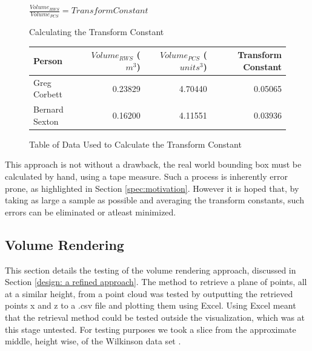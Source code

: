 \begin{figure}[h]
\begin{center}
$\frac{Volume_{RWS}}{Volume_{PCS}} = Transform Constant$
\end{center}
\caption{Calculating the Transform Constant}
\label{testing: calculating the transform constant}
\end{figure}
\begin{figure}[h]
\begin{center}
  \begin{tabular}{| l | r | r | r |}
    \hline
    Person & $Volume_{RWS}$ ($m^3$) & $Volume_{PCS}$ ($units^3$) & Transform Constant \\ \hline
    Greg Corbett 	& 0.23829 & 4.70440 & 0.05065\\ \hline
    Bernard Sexton 	& 0.16200 & 4.11551 & 0.03936\\ \hline
  \end{tabular}
\end{center}
\caption{Table of Data Used to Calculate the Transform Constant}
\label{testing: table of data used to calculate the transform constant}
\end{figure}

This approach is not without a drawback, the real world bounding box must be calculated by hand, using a tape measure. Such a process is inherently error prone, as highlighted in Section \ref{spec:motivation}. However it is hoped that, by taking as large a sample as possible and averaging the transform constants, such errors can be eliminated or atleast minimized.\\

\subsection{Volume Rendering}
\label{testing: volume rendering}
This section details the testing of the volume rendering approach, discussed in Section \ref{design: a refined approach}. The method to retrieve a plane of points, all at a similar height, from a point cloud was tested by outputting the retrieved points x and z to a .csv file and plotting them using Excel. Using Excel meant that the retrieval method could be tested outside the visualization, which was at this stage untested. For testing purposes we took a slice from the approximate middle, height wise, of the Wilkinson data set .\\

